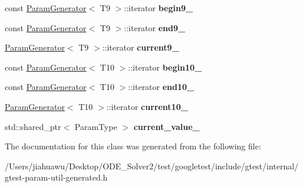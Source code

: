 \begin{DoxyCompactItemize}
\item 
\mbox{\label{classtesting_1_1internal_1_1_cartesian_product_generator10_1_1_iterator_abc7c1588adb4c27e090c6de23016b58c}} 
const \mbox{\hyperlink{classtesting_1_1internal_1_1_param_generator}{Param\+Generator}}$<$ T9 $>$\+::iterator {\bfseries begin9\+\_\+}
\item 
\mbox{\label{classtesting_1_1internal_1_1_cartesian_product_generator10_1_1_iterator_adc5d33dd5a9860613d2518bd6860d17d}} 
const \mbox{\hyperlink{classtesting_1_1internal_1_1_param_generator}{Param\+Generator}}$<$ T9 $>$\+::iterator {\bfseries end9\+\_\+}
\item 
\mbox{\label{classtesting_1_1internal_1_1_cartesian_product_generator10_1_1_iterator_a5c0567f6a9573593a45aff1e989fe9db}} 
\mbox{\hyperlink{classtesting_1_1internal_1_1_param_generator}{Param\+Generator}}$<$ T9 $>$\+::iterator {\bfseries current9\+\_\+}
\item 
\mbox{\label{classtesting_1_1internal_1_1_cartesian_product_generator10_1_1_iterator_a0f7a105284accd72e56e71efe63edb8e}} 
const \mbox{\hyperlink{classtesting_1_1internal_1_1_param_generator}{Param\+Generator}}$<$ T10 $>$\+::iterator {\bfseries begin10\+\_\+}
\item 
\mbox{\label{classtesting_1_1internal_1_1_cartesian_product_generator10_1_1_iterator_a4e1eff374860760ab0583b3b30bf756e}} 
const \mbox{\hyperlink{classtesting_1_1internal_1_1_param_generator}{Param\+Generator}}$<$ T10 $>$\+::iterator {\bfseries end10\+\_\+}
\item 
\mbox{\label{classtesting_1_1internal_1_1_cartesian_product_generator10_1_1_iterator_ae729bdadc391f4f3be20055d7b0b12bd}} 
\mbox{\hyperlink{classtesting_1_1internal_1_1_param_generator}{Param\+Generator}}$<$ T10 $>$\+::iterator {\bfseries current10\+\_\+}
\item 
\mbox{\label{classtesting_1_1internal_1_1_cartesian_product_generator10_1_1_iterator_aff75970fb603c690af7ddfa391fe2799}} 
std\+::shared\+\_\+ptr$<$ Param\+Type $>$ {\bfseries current\+\_\+value\+\_\+}
\end{DoxyCompactItemize}


The documentation for this class was generated from the following file\+:\begin{DoxyCompactItemize}
\item 
/\+Users/jiahuawu/\+Desktop/\+O\+D\+E\+\_\+\+Solver2/test/googletest/include/gtest/internal/gtest-\/param-\/util-\/generated.\+h\end{DoxyCompactItemize}
